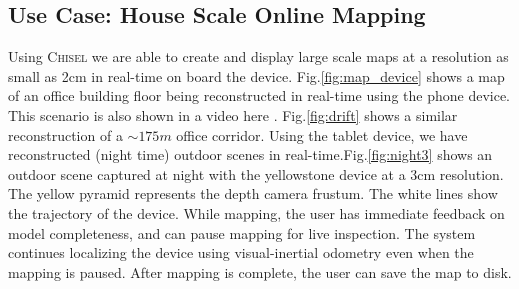 \documentclass[conference]{IEEEtran}
\newcommand{\figref}[1]{Fig.\ref{#1}}
\newcommand{\chisel}{\textsc{Chisel}\xspace}
\begin{document}
%  
%  
\subsection{Use Case: House Scale Online Mapping}
Using \chisel we are able to create and display large scale maps at a
resolution as small as 2cm in real-time on board the device.
\figref{fig:map_device} shows a map of an office building floor being
reconstructed in real-time using the phone device.  This scenario is also shown
in a video here \cite{VIDEO}. \figref{fig:drift} shows a similar reconstruction
of a $\sim 175m$ office corridor. Using the tablet device, we have reconstructed
(night time) outdoor scenes in real-time.\figref{fig:night3} shows an outdoor scene
captured at night with the yellowstone device at a 3cm resolution. The yellow
pyramid represents the depth camera frustum. The white lines show the trajectory
of the device. While mapping, the user has immediate feedback on model
completeness, and can pause mapping for live inspection. The system continues
localizing the device using visual-inertial odometry even when the mapping is
paused. After mapping is complete, the user can save the map to disk.
 
\end{document}
